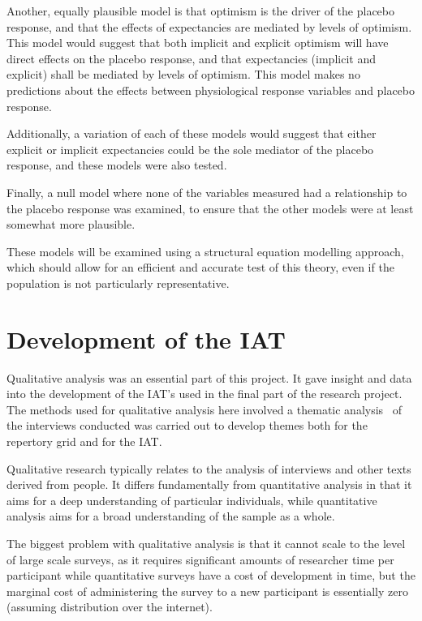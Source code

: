 Another, equally plausible model is that optimism is the driver of the placebo response, and that the effects of expectancies are mediated by levels of optimism. This model would suggest that both implicit and explicit optimism will have direct effects on the placebo response, and that expectancies (implicit and explicit) shall be mediated by levels of optimism. This model makes no predictions about the effects between physiological response variables and placebo response. 

Additionally, a variation of each of these models would suggest that either explicit or implicit expectancies could be the sole mediator of the placebo response, and these models were also tested. 

Finally, a null model where none of the variables measured had a relationship to the placebo response was examined, to ensure that the other models were at least somewhat more plausible. 

These models will be examined using a structural equation modelling approach, which should allow for an efficient and accurate test of this theory, even if the population is not particularly representative. 


\section{Development of the IAT}

Qualitative analysis was an essential part of this project.  
It gave insight and data into the development of the IAT's used in the final part of the research project.
The methods used for qualitative analysis here involved a thematic analysis~\cite{braun2006using} of the interviews conducted was carried out to develop themes both for the repertory grid and for the IAT.

Qualitative research typically relates to the analysis of interviews and other texts derived from people. It differs fundamentally from quantitative analysis in that it aims for a deep understanding of particular individuals, while quantitative analysis aims for a broad understanding of the sample as a whole. 

The biggest problem with qualitative analysis is that it cannot scale to the level of large scale surveys, as it requires significant amounts of researcher time per participant while quantitative surveys have a cost of development in time, but the marginal cost of administering the survey to a new participant is essentially zero (assuming distribution over the internet).

